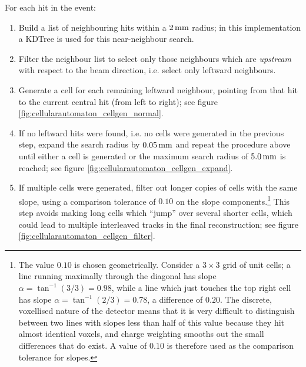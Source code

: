 For each hit in the event:
\begin{enumerate}
	\item Build a list of neighbouring hits within a $2\,\mathrm{mm}$ radius; in this implementation a \ac{KDTree} is used for this near-neighbour search.
	\item Filter the neighbour list to select only those neighbours which are \emph{upstream} with respect to the beam direction, i.e. select only leftward neighbours.
	\item Generate a cell for each remaining leftward neighbour, pointing from that hit to the current central hit (from left to right); see figure \ref{fig:cellularautomaton_cellgen_normal}.
	\item If no leftward hits were found, i.e. no cells were generated in the previous step, expand the search radius by $0.05\,\mathrm{mm}$ and repeat the procedure above until either a cell is generated or the maximum search radius of $5.0\,\mathrm{mm}$ is reached; see figure \ref{fig:cellularautomaton_cellgen_expand}.
    \item If multiple cells were generated, filter out longer copies of cells with the same slope, using a comparison tolerance of $0.10$ on the slope components.\footnote{The value $0.10$ is chosen geometrically. Consider a $3\times 3$ grid of unit cells; a line running maximally through the diagonal has slope $\alpha = \tan^{-1}(3/3) = 0.98$, while a line which just touches the top right cell has slope $\alpha = \tan^{-1}(2/3) = 0.78$, a difference of $0.20$. The discrete, voxellised nature of the detector means that it is very difficult to distinguish between two lines with slopes less than half of this value because they hit almost identical voxels, and charge weighting smooths out the small differences that do exist. A value of $0.10$ is therefore used as the comparison tolerance for slopes.} This step avoids making long cells which ``jump'' over several shorter cells, which could lead to multiple interleaved tracks in the final reconstruction; see figure \ref{fig:cellularautomaton_cellgen_filter}.
\end{enumerate}


